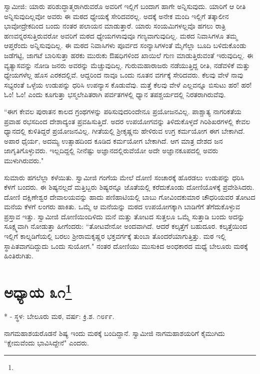 ಸ್ವಾಮೀಜಿ: ಯಾರು ಪರಿಶುದ್ಧಾತ್ಮರಾಗಿರುವರೊ ಅವರಿಗೆ ಇಲ್ಲಿಗೆ ಬಂದಾಗ ಹಾಗೇ ಅನ್ನಿಸುವುದು. ಯಾರಿಗೆ ಆ ರೀತಿ ಅನ್ನಿಸುವುದಿಲ್ಲವೋ ಅವರು ಈ ಮಠದ ಧ್ಯೇಯಕ್ಕೆ ಸೇರಿದವರಲ್ಲ. ಅದಕ್ಕೆ ಅನೇಕ ಮಂದಿ ಇಲ್ಲಿಗೆ ತತ್ಕಾಲೀನ ಭಾವೋದ್ರೇಕದಿಂದ ಬಂದು ನಂತರ ಪಲಾಯನ ಮಾಡುತ್ತಾರೆ. ಯಾರು ಸಂಯಮಿಗಳಲ್ಲವೊ ಹಗಲು ರಾತ್ರಿ ಹಣವನ್ನರಸುತ್ತಿರುವರೋ ಅವರಿಗೆ ಮಠದ ಧ್ಯೇಯಗಳಾವುವೂ ಗಣ್ಯವಾಗುವುದಿಲ್ಲ. ಮಠದ ನಿವಾಸಿಗಳೂ ತಮ್ಮ ಆಪ್ತರೆಂದು ಅನ್ನಿಸುವುದಿಲ್ಲ. ಈ ಮಠದ ನಿವಾಸಿಗಳು ಪೂರ್ವದ ಸಂನ್ಯಾಸಿಗಳಂತೆ ಮೈಗೆಲ್ಲಾ ಬೂದಿ ಬಳಿದುಕೊಂಡು ಜಡೆಗಟ್ಟಿ, ಜಾಗಟೆ ಬಾರಿಸುತ್ತಾ ಹರಕು ಮುರುಕು ಔಷಧಿಗಳಿಂದ ಖಾಯಿಲೆ ಗುಣ ಮಾಡುತ್ತಿರುವಂತೆ ಇರುವುದಿಲ್ಲ. ಈ ವ್ಯತ್ಯಾಸವನ್ನು ನೋಡಿ ಜನರು ಅವರನ್ನು ಮೆಚ್ಚುವುದಿಲ್ಲ. ಗುರುಮಹಾರಾಜರು ನಡೆಯುತ್ತಿದ್ದ ರೀತಿ, ನಡೆವಳಿಕೆ ಮತ್ತು ಧ್ಯೇಯಗಳೆಲ್ಲ ಹೊಸ ಎರಕದಲ್ಲಿವೆ. ಆದ್ದರಿಂದ ನಾವೂ ಒಂದು ನೂತನ ವರ್ಗಕ್ಕೆ ಸೇರಿದವರು. ಕೆಲವು ವೇಳೆ ನಾವು ಸಭ್ಯರಂತೆ ಒಳ್ಳೆಯ ಉಡುಪನ್ನು ಧರಿಸಿ ಉಪನ್ಯಾಸ ಕೊಡುವೆವು. ಮತ್ತೆ ಕೆಲವು ವೇಳೆ ಎಲ್ಲವನ್ನೂ ಬಿಸುಟು ಹರ! ಹರ! ಓಂ! ಓಂ! ಎಂದು ಕೂಗುತ್ತಾ ಭಸ್ಮಲೇಪಿತರಾಗಿ ಪರ್ವತಗಳಲ್ಲಿ ಧ್ಯಾನ ತಪಶ್ಚರ್ಯದಲ್ಲಿ ನಿರತರಾಗಿರುವೆವು.

“ಈಗ ಕೇವಲ ಪುರಾತನ ಕಾಲದ ಗ್ರಂಥಗಳನ್ನು ಪಠಿಸುವುದರಿಂದೇನೂ ಪ್ರಯೋಜನವಿಲ್ಲ. ಪಾಶ್ಚಾತ್ಯ ನಾಗರಿಕತೆಯ ಪ್ರವಾಹ ರಭಸದಿಂದ ದೇಶಾದ್ಯಂತ ಪ್ರವಹಿಸುತ್ತಿದೆ. ಅದರ ಉಪಯೋಗವನ್ನು ತಿಳಿದುಕೊಳ್ಳದೆ ಗಿರಿಶಿಖರಗಳಲ್ಲಿ ಕೇವಲ ಧ್ಯಾನದಲ್ಲಿ ಕುಳಿತಿದ್ದರೆ ಪ್ರಯೋಜನವಿಲ್ಲ. ಗೀತೆಯಲ್ಲಿ ಶ‍್ರೀಕೃಷ್ಣನು ಹೇಳಿರುವ ಉಗ್ರ ಕರ್ಮಯೋಗ ಈಗ ಬೇಕಾಗಿದೆ. ಅಪಾರ ಧೈರ್ಯ, ಅದಮ್ಯ ಉತ್ಸಾಹದಿಂದ ಕೂಡಿದ ಕರ್ಮಯೋಗ ಬೇಕಾಗಿದೆ. ಆಗ ಮಾತ್ರ ದೇಶದ ಜನ ಜಾಗೃತಿಗೊಳ್ಳುವರು. ಇಲ್ಲದಿದ್ದಲ್ಲಿ ನೀನೆಷ್ಟು ಅಜ್ಞಾನದಲ್ಲಿರುವೆಯೋ ಅದೇ ಅಜ್ಞಾನಕೂಪದಲ್ಲಿ ಅವರು ಮುಳುಗಿರುವರು."

ಸುಮಾರು ಹಗಲೆಲ್ಲಾ ಕಳೆಯಿತು. ಸ್ವಾಮೀಜಿ ಗಂಗೆಯ ಮೇಲೆ ದೋಣಿ ಸಂಚಾರಕ್ಕೆ ಹೊರಡಲು ಉಡುಪನ್ನು ಧರಿಸಿ ಕೆಳಗೆ ಬಂದರು. ಈ ಶಿಷ್ಯನಲ್ಲದೆ ಮತ್ತಿಬ್ಬರು ಶಿಷ್ಯರನ್ನೂ ಜೊತೆಯಲ್ಲಿ ಕರೆದುಕೊಂಡು ದೋಣಿಯೊಳಕ್ಕೆ ಪ್ರವೇಶಿಸಿದರು. ದೋಣಿ ದಕ್ಷಿಣೇಶ್ವರ ದೇವಾಲಯವನ್ನು ಹಾದು ಪಣಿಹಾಟಿಯಲ್ಲಿ ಬಾಬು ಗೋವಿಂದಕುಮಾರ ಚೌಧರಿಯವರ ತೋಟದ ಮನೆಯ ಕೆಳಗೆ ಲಂಗರು ಹಾಕಿತು. ಒಮ್ಮೆ ಆ ಮನೆಯನ್ನು ಮಠದ ಉಪಯೋಗಕ್ಕಾಗಿ ಬಾಡಿಗೆಗೆ ತೆಗೆದುಕೊಳ್ಳುವ ಪ್ರಸ್ತಾವ ಇತ್ತು. ಸ್ವಾಮೀಜಿ ದೋಣಿಯಿಂದಿಳಿದು ಮನೆ ಮತ್ತು ತೋಟದ ಸುತ್ತಲೂ ಒಮ್ಮೆ ಸುತ್ತಾಡಿ ಬಂದು ಅದನ್ನು ಸೂಕ್ಷ್ಮವಾಗಿ ನೋಡುತ್ತಾ ಹೀಗೆಂದರು: “ತೋಟವೇನೋ ಅಂದವಾಗಿದೆ. ಆದರೆ ಕಲ್ಕತ್ತೆಗೆ ಬಹುದೂರ. ಕಲ್ಕತ್ತೆಯಿಂದ ಇಲ್ಲಿಗೆ ಕಾಲ್ನಡಿಗೆಯಲ್ಲಿ ಬರಲು ಶ‍್ರೀರಾಮಕೃಷ್ಣರ ಭಕ್ತವರ್ಗಕ್ಕೆ ತುಂಬಾ ತೊಂದರೆಯಾಗುತ್ತಿತ್ತು. ಮಠ ಇಲ್ಲಿ ಸ್ಥಾಪಿತವಾಗದಿದ್ದುದು ಒಂದು ಸುಯೋಗ." ನಂತರ ದೋಣಿಯು ಮುಸುಕಿದ ಅಂಧಕಾರದ ಮಧ್ಯೆ ಬೇಲೂರು ಮಠಕ್ಕೆ ಹಿಂತಿರುಗಿತು.

\newpage

\chapter[ಅಧ್ಯಾಯ ೩೧]{ಅಧ್ಯಾಯ ೩೧\protect\footnote{}}

\centerline{* - ಸ್ಥಳ: ಬೇಲೂರು ಮಠ, ವರ್ಷ: ಕ್ರಿ.ಶ. ೧೮೯೯.}

ನಾಗಮಹಾಶಯರೊಡನೆ ಶಿಷ್ಯ ಇಂದು ಮಠಕ್ಕೆ ಬಂದಿದ್ದಾನೆ. ಸ್ವಾಮೀಜಿ ನಾಗಮಹಾಶಯರಿಗೆ ಕೈಮುಗಿದು “ಕ್ಷೇಮವೆಂದು ಭಾವಿಸಿದ್ದೇನೆ" ಎಂದರು.

